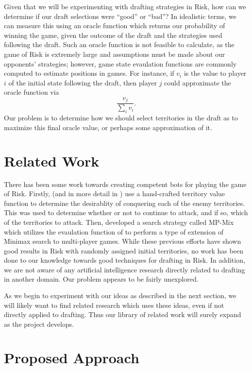 \documentclass[letterpaper]{article}
\numberwithin{equation}{section}
\numberwithin{theorem}{section}
\numberwithin{lemma}{section}
\numberwithin{df}{section}
\begin{document}
Given that we will be experimenting with drafting strategies in Risk, how can we determine if our draft selections were ``good'' or ``bad''?  In idealistic terms, we can measure this using an oracle function which returns our probability of winning the game, given the outcome of the draft and the strategies used following the draft.  Such an oracle function is not feasible to calculate, as the game of Risk is extremely large and assumptions must be made about our opponents' strategies; however, game state evaulation functions are commonly computed to estimate positions in games.  For instance, if $v_i$ is the value to player $i$ of the initial state following the draft, then player $j$ could approximate the oracle function via
\[ \frac{v_j}{\sum_i v_i}. \]
Our problem is to determine how we should select territories in the draft as to maximize this final oracle value, or perhaps some approximation of it.

\section{Related Work}

There has been some work towards creating competent bots for playing the game of Risk.  Firstly, \cite{JohOls2006} (and in more detail in \cite{Ols2005}) use a hand-crafted territory value function to determine the desirablity of conquering each of the enemy territories.  This was used to determine whether or not to continue to attack, and if so, which of the territories to attack.  Then, \cite{ZuckFelnerKraus2009} developed a search strategy called MP-Mix which utilizes the evaulation function of \cite{JohOls2006} to perform a type of extension of Minimax search to multi-player games.  While these previous efforts have shown good results in Risk with randomly assigned initial territories, no work has been done to our knowledge towards good techniques for drafting in Risk.  In addition, we are not aware of any artificial intelligence research directly related to drafting in another domain.  Our problem appears to be fairly unexplored.

As we begin to experiment with our ideas as described in the next section, we will likely want to find related research which uses these ideas, even if not directly applied to drafting.  Thus our library of related work will surely expand as the project develops.

\section{Proposed Approach}
\end{document}
